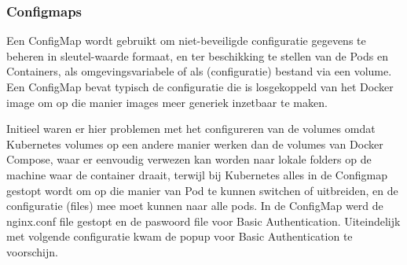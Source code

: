 \subsubsection{Configmaps} 
\autocite{Kubernetes2023e}
\newline
Een ConfigMap wordt gebruikt om niet-beveiligde configuratie gegevens te beheren in sleutel-waarde formaat, en ter beschikking te stellen van de Pods en Containers, als omgevingsvariabele of als (configuratie) bestand via een volume.
Een ConfigMap bevat typisch de configuratie die is losgekoppeld van het Docker image om op die manier images meer generiek inzetbaar te maken.\textcite{Kubernetes2023}


Initieel waren er hier problemen met het configureren van de volumes omdat Kubernetes volumes op een andere manier werken dan de volumes van Docker Compose, waar er eenvoudig verwezen kan worden naar lokale folders op de machine waar de container draait, terwijl bij Kubernetes alles in de Configmap gestopt wordt om op die manier van Pod te kunnen switchen of uitbreiden, en de configuratie (files) mee moet kunnen naar alle pods.
\newline
\newline
In de ConfigMap werd de nginx.conf file gestopt en de paswoord file voor Basic Authentication.
Uiteindelijk met volgende configuratie kwam de popup voor Basic Authentication te voorschijn.
\newpage
